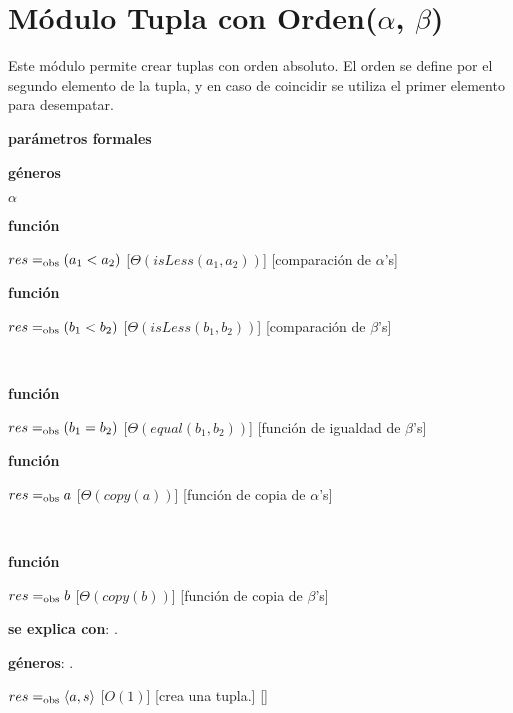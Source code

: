 \section{Módulo Tupla con Orden(\texorpdfstring{$\alpha$}{α}, \texorpdfstring{$\beta$}{β})}

Este módulo permite crear tuplas con orden absoluto. El orden se define por el segundo elemento de la tupla, y en caso de coincidir se utiliza el primer elemento para desempatar.

\begin{Interfaz}

	\textbf{parámetros formales}\parindent\\
	\parbox{1.7cm}{\textbf{géneros}}$\alpha$\\
	\parbox[t]{1.7cm}{\textbf{función}}\parbox[t]{.5\textwidth-\parindent-1.7cm}{
		{$res =_{\mathrm{obs}} (a_1 < a_2)$}
		[$\Theta(isLess(a_1, a_2))$]
		[comparación de $\alpha$'s]
	}
	\parbox[t]{1.7cm}{\textbf{función}}\parbox[t]{.5\textwidth-\parindent-1.7cm}{
		{$res =_{\mathrm{obs}} (b_1 < b_2)$}
		[$\Theta(isLess(b_1, b_2))$]
		[comparación de $\beta$'s]
	}\\[2ex]
	\parbox[t]{1.7cm}{\textbf{función}}\parbox[t]{.5\textwidth-\parindent-1.7cm}{
		{$res =_{\mathrm{obs}} (b_1 = b_2)$}
		[$\Theta(equal(b_1, b_2))$]
		[función de igualdad de $\beta$'s]
	}
	\parbox[t]{1.7cm}{\textbf{función}}\parbox[t]{.5\textwidth-\parindent-1.7cm}{
		{$res =_{\mathrm{obs}} a$}
		[$\Theta(copy(a))$]
		[función de copia de $\alpha$'s]
	}\\[2ex]
	\parbox[t]{1.7cm}{\textbf{función}}\parbox[t]{.5\textwidth-\parindent-1.7cm}{
		{$res =_{\mathrm{obs}} b$}
		[$\Theta(copy(b))$]
		[función de copia de $\beta$'s]
	}

	\textbf{se explica con}: .

	\textbf{géneros}: .


	{$res =_{\mathrm{obs}} \langle a, s \rangle$}
	[$O(1)$]
	[crea una tupla.]
	[]	


\end{Interfaz}
